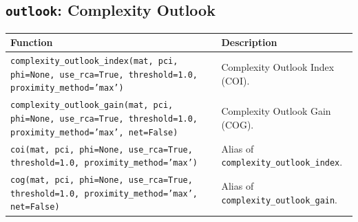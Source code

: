 \subsection{\texttt{outlook}: Complexity Outlook}
\begin{longtable}{>{\raggedright\arraybackslash}p{9.2cm} >{\raggedright\arraybackslash}p{7.0cm}}
\toprule
\textbf{Function} & \textbf{Description} \\
\midrule\endhead
\texttt{\footnotesize complexity\_outlook\_index(mat, pci, phi=None, use\_rca=True, threshold=1.0, proximity\_method='max')} & {\small Complexity Outlook Index (COI).} \\[2pt]
\texttt{\footnotesize complexity\_outlook\_gain(mat, pci, phi=None, use\_rca=True, threshold=1.0, proximity\_method='max', net=False)} & {\small Complexity Outlook Gain (COG).} \\[2pt]
\texttt{\footnotesize coi(mat, pci, phi=None, use\_rca=True, threshold=1.0, proximity\_method='max')} & {\small Alias of \texttt{complexity\_outlook\_index}.} \\[2pt]
\texttt{\footnotesize cog(mat, pci, phi=None, use\_rca=True, threshold=1.0, proximity\_method='max', net=False)} & {\small Alias of \texttt{complexity\_outlook\_gain}.} \\[2pt]
\bottomrule
\end{longtable}


